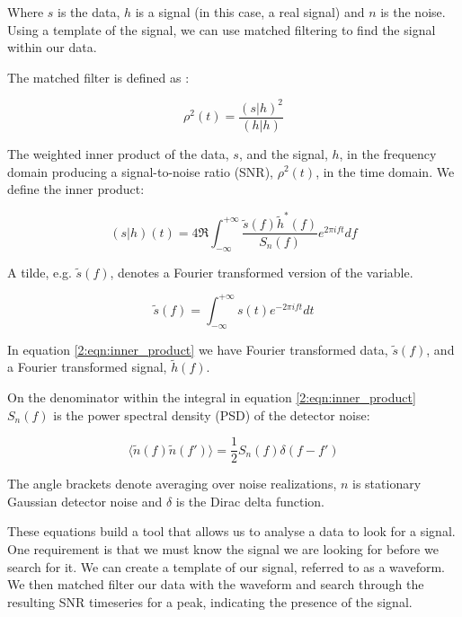 Where $s$ is the data, $h$ is a signal (in this case, a real \gw signal) and $n$ is the noise. Using a template of the signal, we can use matched filtering to find the signal within our data.

The matched filter is defined as \cite{PyCBC:2016}:

\begin{equation}
   \rho^2(t) = \frac{(s|h)^2}{(h|h)}
   \label{2:eqn:matched_filter}
\end{equation}

The weighted inner product of the data, $s$, and the signal, $h$, in the frequency domain producing a signal-to-noise ratio (SNR), $\rho^2(t)$, in the time domain. We define the inner product:

\begin{equation}
   (s|h)(t) = 4 \Re \int^{+\infty}_{-\infty} \frac{\tilde{s}(f) \tilde{h}^*(f)}{S_n(f)} e^{2 \pi i f t} df
   \label{2:eqn:inner_product}
\end{equation}

A tilde, e.g. $\tilde{s}(f)$, denotes a Fourier transformed version of the variable.

\begin{equation}
   \tilde{s}(f) = \int^{+\infty}_{-\infty} s(t) e^{-2 \pi i f t} dt
   \label{2:eqn:fourier_transform}
\end{equation}

In equation \ref{2:eqn:inner_product} we have Fourier transformed data, $\tilde{s}(f)$, and a Fourier transformed signal, $\tilde{h}(f)$.

On the denominator within the integral in equation \ref{2:eqn:inner_product} $S_n(f)$ is the power spectral density (PSD) of the detector noise:

\begin{equation}
   \langle \tilde{n}(f) \tilde{n}(f') \rangle = \frac{1}{2} S_n(f) \delta(f-f')
   \label{2:eqn:PSD}
\end{equation}

The angle brackets denote averaging over noise realizations, $n$ is stationary Gaussian detector noise and $\delta$ is the Dirac delta function.

These equations build a tool that allows us to analyse a data to look for a signal. One requirement is that we must know the signal we are looking for before we search for it. We can create a template of our signal, referred to as a waveform. We then matched filter our data with the waveform and search through the resulting SNR timeseries for a peak, indicating the presence of the signal.

